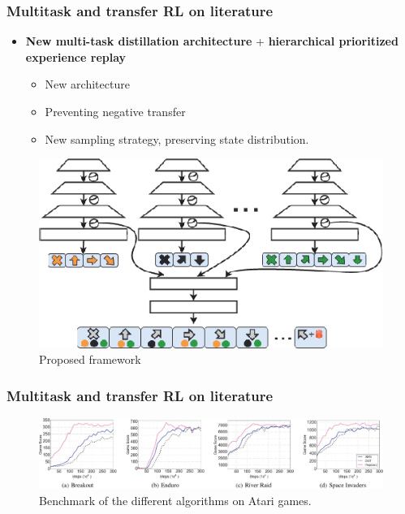 \documentclass{beamer}
\theoremstyle{remark}
\theoremstyle{plain}
\begin{document}
\begin{frame}
  \frametitle{Multitask and transfer RL on literature}
\begin{itemize}
    \item \textbf{New multi-task distillation architecture} + \textbf{hierarchical prioritized experience replay} \cite{YinKnowledgeReplay}
    \begin{itemize}
        \item New architecture
        \item Preventing negative transfer
        \item New sampling strategy, preserving state distribution.
    \end{itemize} 
\end{itemize}
\begin{figure}
    \centering
    \includegraphics[scale=0.3]{figs/transfer.png}
    \caption{Proposed framework}
    \label{fig:my_label}
\end{figure}
 \end{frame}
 
\begin{frame}
  \frametitle{Multitask and transfer RL on literature} 
  \begin{figure}
      \centering
      \includegraphics[scale=0.24]{figs/comparison.png}
      \caption{Benchmark of the different algorithms on Atari games.}
      \label{fig:my_label}
  \end{figure}
\end{frame}
 
\end{document}
